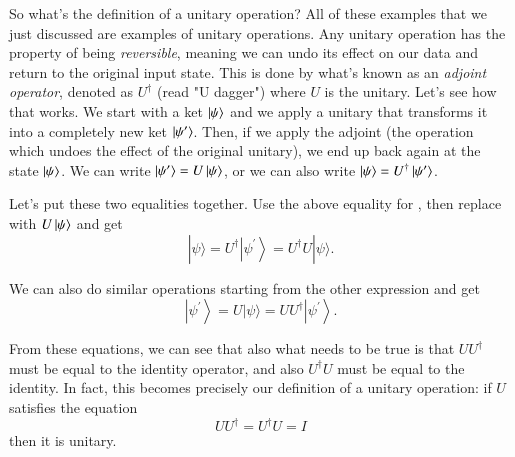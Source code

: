 So what's the definition of a unitary operation? All of these examples that we just discussed are examples of unitary operations. Any unitary operation has the property of being \emph{reversible}, meaning we can undo its effect on our data and return to the original input state. This is done by what's known as an \emph{adjoint operator}, denoted as $U^\dagger$ (read "U dagger") where $U$ is the unitary.
Let's see how that works. We start with a ket $\left| \psi \right\rangle$ and we apply a unitary that transforms it into a completely new ket $\left| \psi' \right\rangle$. Then, if we apply the adjoint (the operation which undoes the effect of the original unitary), we end up back again at the state $\left| \psi \right\rangle$. We can write $\left| \psi' \right\rangle = U\left| \psi \right\rangle$, or we can also write $\left| \psi \right\rangle = U^\dagger\left| \psi' \right\rangle$. 

Let's put these two equalities together. Use the above equality for \ket{\psi}, then replace  with $U\left| \psi \right\rangle$ and get
\begin{equation}
|\psi\rangle=U^{\dagger}\left|\psi^{\prime}\right\rangle=U^{\dagger} U|\psi\rangle.
\end{equation} 


We can also do similar operations starting from the other expression and get
\begin{equation}
\left|\psi^{\prime}\right\rangle=U|\psi\rangle=U U^{\dagger}\left|\psi^{\prime}\right\rangle.
\end{equation}

From these equations,  we can see that also what needs to be true is that $UU^\dagger$ must be equal to the identity operator, and also $U^\dagger U$ must be equal to the identity.
In fact, this becomes precisely our definition of a unitary operation: if $U$ satisfies the equation
\begin{equation}
U U^{\dagger}=U^{\dagger} U=I
\end{equation}
then it is unitary.

